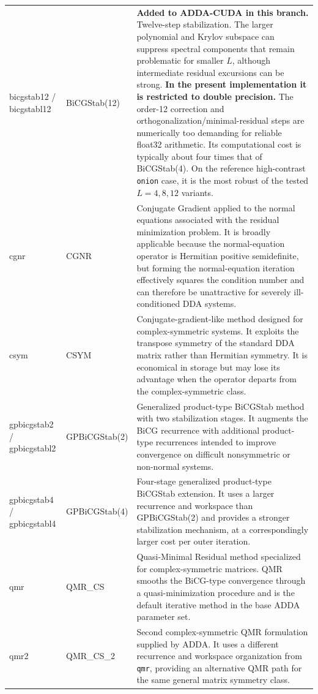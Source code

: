 \documentclass[11pt,a4paper]{article}
\begin{document}
\begin{longtable}{>{\ttfamily}p{3.15cm} p{3.25cm} p{8.45cm}}
bicgstab12 / bicgstabl12 &
BiCGStab(12) &
\textbf{Added to ADDA-CUDA in this branch.} Twelve-step stabilization. The larger polynomial and Krylov subspace can suppress spectral components that remain problematic for smaller \(L\), although intermediate residual excursions can be strong. \textbf{In the present implementation it is restricted to double precision.} The order-12 correction and orthogonalization/minimal-residual steps are numerically too demanding for reliable float32 arithmetic. Its computational cost is typically about four times that of BiCGStab(4). On the reference high-contrast \texttt{onion} case, it is the most robust of the tested \(L=4,8,12\) variants. \\

cgnr &
CGNR &
Conjugate Gradient applied to the normal equations associated with the residual minimization problem. It is broadly applicable because the normal-equation operator is Hermitian positive semidefinite, but forming the normal-equation iteration effectively squares the condition number and can therefore be unattractive for severely ill-conditioned DDA systems. \\

csym &
CSYM &
Conjugate-gradient-like method designed for complex-symmetric systems. It exploits the transpose symmetry of the standard DDA matrix rather than Hermitian symmetry. It is economical in storage but may lose its advantage when the operator departs from the complex-symmetric class. \\

gpbicgstab2 / gpbicgstabl2 &
GPBiCGStab(2) &
Generalized product-type BiCGStab method with two stabilization stages. It augments the BiCG recurrence with additional product-type recurrences intended to improve convergence on difficult nonsymmetric or non-normal systems. \\

gpbicgstab4 / gpbicgstabl4 &
GPBiCGStab(4) &
Four-stage generalized product-type BiCGStab extension. It uses a larger recurrence and workspace than GPBiCGStab(2) and provides a stronger stabilization mechanism, at a correspondingly larger cost per outer iteration. \\

qmr &
QMR\_CS &
Quasi-Minimal Residual method specialized for complex-symmetric matrices. QMR smooths the BiCG-type convergence through a quasi-minimization procedure and is the default iterative method in the base ADDA parameter set. \\

qmr2 &
QMR\_CS\_2 &
Second complex-symmetric QMR formulation supplied by ADDA. It uses a different recurrence and workspace organization from \texttt{qmr}, providing an alternative QMR path for the same general matrix symmetry class. \\
\bottomrule
\end{longtable}
\end{document}
